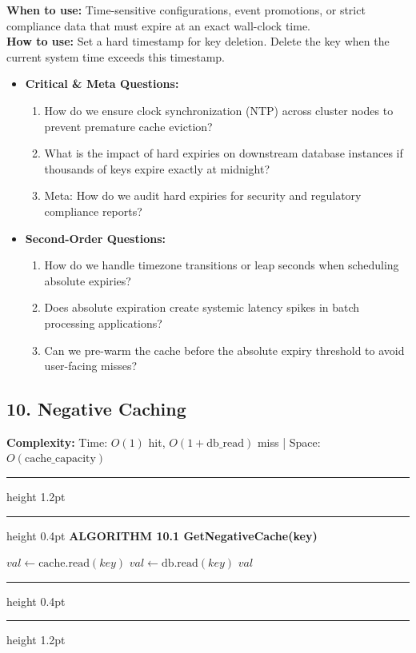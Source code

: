 \documentclass[11pt,a4paper]{article}
\newenvironment{textbookalgo}[2]{%
  \par\addvspace{1.2em}\noindent
  \hrule height 1.2pt
  \vspace{1.5pt}
  \hrule height 0.4pt
  \vspace{5pt}
  {\noindent\large\bfseries\sffamily ALGORITHM #1 \quad #2}
  \par\vspace{5pt}
  \RestyleAlgo{plain}
}{%
  \par\vspace{4pt}
  \hrule height 0.4pt
  \vspace{1.5pt}
  \hrule height 1.2pt
  \par\addvspace{1.2em}
}
\theoremstyle{definition}
\begin{document}
\noindent
\textbf{When to use:} Time-sensitive configurations, event promotions, or strict compliance data that must expire at an exact wall-clock time.\\
\textbf{How to use:} Set a hard timestamp for key deletion. Delete the key when the current system time exceeds this timestamp.
\begin{itemize}[leftmargin=*]
  \item[] \textbf{Critical \& Meta Questions:}
  \begin{enumerate}
  \item How do we ensure clock synchronization (NTP) across cluster nodes to prevent premature cache eviction?
  \item What is the impact of hard expiries on downstream database instances if thousands of keys expire exactly at midnight?
  \item Meta: How do we audit hard expiries for security and regulatory compliance reports?
  \end{enumerate}
  \item[] \textbf{Second-Order Questions:}
  \begin{enumerate}
  \item How do we handle timezone transitions or leap seconds when scheduling absolute expiries?
  \item Does absolute expiration create systemic latency spikes in batch processing applications?
  \item Can we pre-warm the cache before the absolute expiry threshold to avoid user-facing misses?
  \end{enumerate}
\end{itemize}
\medskip

\clearpage
\subsection{10. Negative Caching}

\noindent
\textbf{Complexity:} Time: $O(1)$ hit, $O(1 + \text{db\_read})$ miss | Space: $O(\text{cache\_capacity})$
\smallskip

\begin{textbookalgo}{10.1}{GetNegativeCache(key)}
\begin{algorithm}[H]
$val \leftarrow \text{cache.read}(key)$\;
$val \leftarrow \text{db.read}(key)$\;
\Return $val$\;
\end{algorithm}
\end{textbookalgo}
\end{document}
